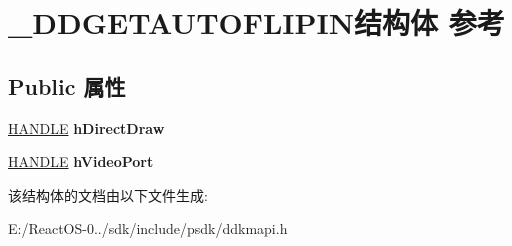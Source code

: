 \hypertarget{struct___d_d_g_e_t_a_u_t_o_f_l_i_p_i_n}{}\section{\+\_\+\+D\+D\+G\+E\+T\+A\+U\+T\+O\+F\+L\+I\+P\+I\+N结构体 参考}
\label{struct___d_d_g_e_t_a_u_t_o_f_l_i_p_i_n}
\subsection*{Public 属性}
\begin{DoxyCompactItemize}
\item 
\mbox{\label{struct___d_d_g_e_t_a_u_t_o_f_l_i_p_i_n_a0481d5e917e33150dbc59ae904ac84f2}} 
\hyperlink{interfacevoid}{H\+A\+N\+D\+LE} {\bfseries h\+Direct\+Draw}
\item 
\mbox{\label{struct___d_d_g_e_t_a_u_t_o_f_l_i_p_i_n_a1e8137886be296da82c503882f21f0b8}} 
\hyperlink{interfacevoid}{H\+A\+N\+D\+LE} {\bfseries h\+Video\+Port}
\end{DoxyCompactItemize}


该结构体的文档由以下文件生成\+:\begin{DoxyCompactItemize}
\item 
E\+:/\+React\+O\+S-\/0../sdk/include/psdk/ddkmapi.\+h\end{DoxyCompactItemize}
